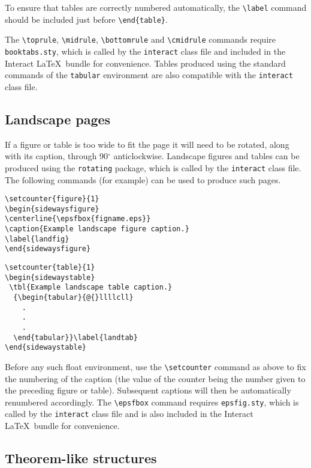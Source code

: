 \documentclass[]{interact}
\theoremstyle{plain}%
\theoremstyle{definition}
\theoremstyle{remark}
\begin{document}
To ensure that tables are correctly numbered automatically, the \verb"\label" command should be included just before \verb"\end{table}".

The \verb"\toprule", \verb"\midrule", \verb"\bottomrule" and \verb"\cmidrule" commands require \verb"booktabs.sty", which is called by the \texttt{interact} class file and included in the \textsf{Interact} \LaTeX\ bundle for convenience. Tables produced using the standard commands of the \texttt{tabular} environment are also compatible with the \texttt{interact} class file.


\subsection{Landscape pages}

If a figure or table is too wide to fit the page it will need to be rotated, along with its caption, through 90$^{\circ}$ anticlockwise.
Landscape figures and tables can be produced using the \verb"rotating" package, which is called by the \texttt{interact} class file.
The following commands (for example) can be used to produce such pages.
\begin{verbatim}
\setcounter{figure}{1}
\begin{sidewaysfigure}
\centerline{\epsfbox{figname.eps}}
\caption{Example landscape figure caption.}
\label{landfig}
\end{sidewaysfigure}
\end{verbatim}
\begin{verbatim}
\setcounter{table}{1}
\begin{sidewaystable}
 \tbl{Example landscape table caption.}
  {\begin{tabular}{@{}llllcll}
    .
    .
    .
  \end{tabular}}\label{landtab}
\end{sidewaystable}
\end{verbatim}
Before any such float environment, use the \verb"\setcounter" command as above to fix the numbering of the caption (the value of the counter being the number given to the preceding figure or table). Subsequent captions will then be automatically renumbered accordingly. The \verb"\epsfbox" command requires \verb"epsfig.sty", which is called by the \texttt{interact} class file and is also included in the \textsf{Interact} \LaTeX\ bundle for convenience.


\subsection{Theorem-like structures}
\end{document}
